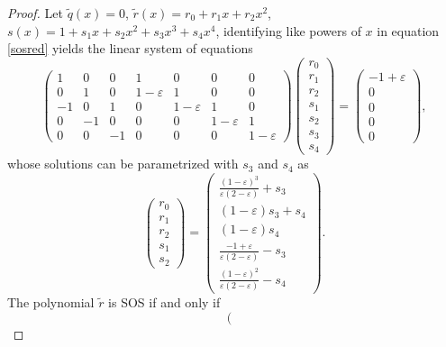 \documentclass[a4paper,12pt]{article}
\begin{document}
\begin{proof}
Let ${\tilde{q}}(x)=0$, ${\tilde{r}}(x)=r_0+r_1 x +r_2 x^2$, $s(x)=1+s_1x+s_2x^2+s_3x^3+s_4x^4$, identifying like powers of $x$ in equation \eqref{sosred} yields the linear system of equations
\[
\left(\begin{array}{ccc|cccc}
1 & 0 & 0 & 1 & 0 & 0 & 0  \\
0 & 1 & 0 & 1-\varepsilon & 1 & 0 & 0 \\
-1 & 0 & 1 & 0 & 1-\varepsilon & 1 & 0\\
0 & -1 & 0 & 0 & 0 & 1-\varepsilon & 1 \\
0 & 0 & -1 & 0 & 0 & 0 & 1-\varepsilon
\end{array}\right)
\left(\begin{array}{c}
r_0 \\ r_1 \\ r_2 \\ \hline s_1  \\ s_2 \\ s_3 \\ s_4 
\end{array}\right)=
\left(\begin{array}{c}
-1+\varepsilon \\  0 \\ 0 \\ 0  \\ 0
\end{array}\right) ,
\]
whose solutions can be parametrized with $s_3$ and $s_4$ as
\begin{equation}\label{param3}
\left(\begin{array}{c}
r_0 \\ r_1 \\ r_2 \\ \hline s_1  \\ s_2
\end{array}\right)
=
\left(\begin{array}{c}
\frac{(1-\varepsilon)^3}{\varepsilon(2-\varepsilon)} + s_3 \\ (1-\varepsilon)s_3 + s_4 \\ (1-\varepsilon)s_4 \\ \hline \frac{-1+\varepsilon}{\varepsilon(2-\varepsilon)} - s_3 \\ \frac{(1-\varepsilon)^2}{\varepsilon(2-\varepsilon)} - s_4
\end{array}\right).
\end{equation}
The polynomial ${\tilde{r}}$ is SOS if and only if
\[
\left(\begin{array}{cc}

\end{array}\]
\end{proof}
\end{document}
